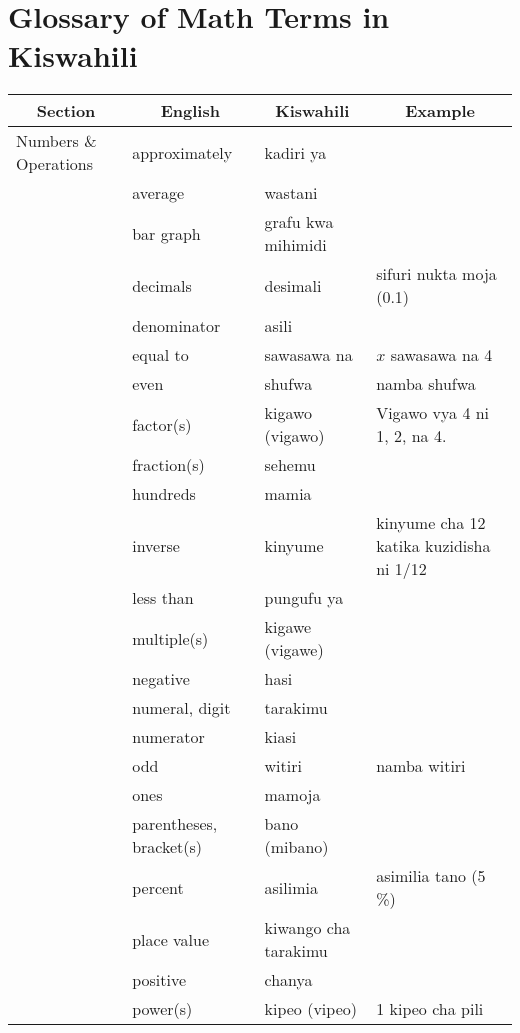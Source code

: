 \chapter{Glossary of Math Terms in Kiswahili}

\begin{center}
\begin{longtable}{|m{2cm}|m{4cm}|m{4cm}|m{4cm}|}\hline

\multicolumn{1}{|c|}{\textbf{Section}}	&	\multicolumn{1}{c|}{\textbf{English}}	&	\multicolumn{1}{c|}{\textbf{Kiswahili}}	&	\multicolumn{1}{c|}{\textbf{Example}}	\\	\hline
Numbers \& Operations	&	approximately	&	kadiri ya	&		\\	\hline
	&	average	&	wastani	&		\\	\hline
	&	bar graph	&	grafu kwa mihimidi	&		\\	\hline
	&	decimals	&	desimali	&	sifuri nukta moja (0.1)	\\	\hline
	&	denominator	&	asili	&		\\	\hline
	&	equal to	&	sawasawa na	&	$x$ sawasawa na 4	\\	\hline
	&	even	&	shufwa	&	namba shufwa	\\	\hline
	&	factor(s)	&	kigawo (vigawo)	&	Vigawo vya 4 ni 1, 2, na 4.	\\	\hline
	&	fraction(s)	&	sehemu	&		\\	\hline
	&	hundreds	&	mamia	&		\\	\hline
	&	inverse	&	kinyume	&	kinyume cha 12 katika kuzidisha ni 1/12	\\	\hline
	&	less than	&	pungufu ya	&		\\	\hline
	&	multiple(s)	&	kigawe (vigawe)	&		\\	\hline
	&	negative	&	hasi	&		\\	\hline
	&	numeral, digit	&	tarakimu	&		\\	\hline
	&	numerator	&	kiasi	&		\\	\hline
	&	odd	&	witiri	&	namba witiri	\\	\hline
	&	ones	&	mamoja	&		\\	\hline
	&	parentheses, bracket(s)	&	bano (mibano)	&		\\	\hline
	&	percent	&	asilimia	&	asimilia tano (5 \%)	\\	\hline
	&	place value	&	kiwango cha tarakimu	&		\\	\hline
	&	positive	&	chanya	&		\\	\hline
	&	power(s)	&	kipeo (vipeo)	&	1 kipeo cha pili	\\	\hline

\end{longtable}
\end{center}
